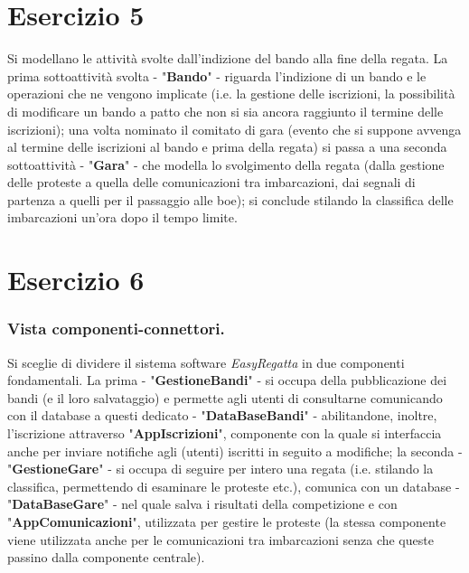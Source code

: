\documentclass[10pt, openany, landscape]{book}
\begin{document}
\section{Esercizio 5}
Si modellano le attivit\`a svolte dall'indizione del bando alla fine della regata.
La prima sottoattivit\`a svolta - "\textbf{Bando}" - riguarda l'indizione di un bando e le operazioni che ne vengono implicate
(i.e. la gestione delle iscrizioni, la possibilit\`a di modificare un bando a patto che non si sia ancora raggiunto il termine
delle iscrizioni); una volta nominato il comitato di gara (evento che si suppone avvenga al termine delle iscrizioni al bando
e prima della regata) si passa a una seconda sottoattivit\`a - "\textbf{Gara}" - che modella lo svolgimento della regata (dalla
gestione delle proteste a quella delle comunicazioni tra imbarcazioni, dai segnali di partenza a quelli per il passaggio alle boe);
si conclude stilando la classifica delle imbarcazioni un'ora dopo il tempo limite.

\pagebreak

\section{Esercizio 6}
\subsubsection*{Vista componenti-connettori.}
Si sceglie di dividere il sistema software \textit{EasyRegatta} in due componenti fondamentali.
La prima - "\textbf{GestioneBandi}" - si occupa della pubblicazione dei bandi (e il loro salvataggio) e permette agli
utenti di consultarne comunicando con il database a questi dedicato - "\textbf{DataBaseBandi}" - abilitandone, inoltre, l'iscrizione
attraverso "\textbf{AppIscrizioni}", componente con la quale si interfaccia anche per inviare notifiche agli (utenti) iscritti
in seguito a modifiche; la seconda - "\textbf{GestioneGare}" - si occupa di seguire per intero una regata (i.e. stilando
la classifica, permettendo di esaminare le proteste etc.), comunica con un database - "\textbf{DataBaseGare}" - nel quale
salva i risultati della competizione e con "\textbf{AppComunicazioni}", utilizzata per gestire le proteste (la stessa componente
viene utilizzata anche per le comunicazioni tra imbarcazioni senza che queste passino dalla componente centrale).

\pagebreak
\end{document}
